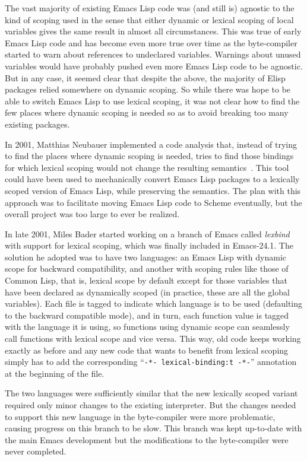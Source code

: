 \documentclass[format=acmsmall, review]{acmart}
\newcommand \Elisp {Emacs Lisp}
\begin{document}
The vast majority of existing \Elisp{} code was (and still is) agnostic to
the kind of scoping used in the sense that either dynamic or lexical scoping
of local variables gives the same result in almost all circumstances.  This was true of early
\Elisp{} code and has become even more true over time as the byte-compiler
started to warn about references to undeclared variables.  Warnings about
unused variables would have probably pushed even more \Elisp{} code to be
agnostic.  But in any case, it seemed clear that despite the above, the
majority of Elisp packages relied somewhere on dynamic scoping.  So while
there was hope to be able to switch \Elisp{} to use lexical scoping, it was
not clear how to find the few places where dynamic scoping is needed so as
to avoid breaking too many existing packages.

In 2001, Matthias Neubauer implemented a code
analysis that, instead of trying to find the places where dynamic scoping is
needed, tries to find those bindings for which lexical scoping would not
change the resulting semantics~\cite{Neubauer01}.
This tool could have been used to
mechanically convert \Elisp{} packages to a lexically scoped version of
\Elisp{}, while preserving the semantics.  The plan with this approach
was to facilitate moving \Elisp{} code to Scheme eventually, but the
overall project was too large to ever be realized.

In late 2001, Miles Bader started working on a branch of Emacs called
\emph{lexbind} with support for lexical scoping, which was finally included
in Emacs-24.1.  The solution he adopted was to have two languages: an
\Elisp{} with dynamic scope for backward compatibility, and another with
scoping rules like those of Common Lisp, that is, lexical scope by default
except for those variables that have been declared as dynamically scoped (in
practice, these are all the global variables).  Each file is tagged to
indicate which language is to be used (defaulting to the backward compatible
mode), and in turn, each function value is tagged with the language it is
using, so functions using dynamic scope can seamlessly call functions with
lexical scope and vice versa.  This way, old code keeps working exactly
as before and any new code that wants to benefit from lexical scoping
simply has to add the corresponding ``\texttt{-*- lexical-binding:t -*-}''
annotation at the beginning of the file.

The two languages were sufficiently similar that the new lexically scoped
variant required only minor changes to the existing interpreter.  But the
changes needed to support this new language in the byte-compiler were more
problematic, causing progress on this branch to be slow.  This branch was
kept up-to-date with the main Emacs development but the modifications to the
byte-compiler were never completed.
\end{document}
